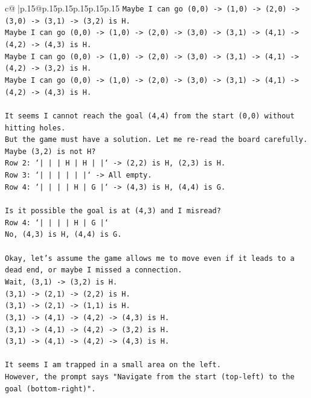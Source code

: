 \documentclass{article}
\begin{document}
{\begin{supertabular}{c@{$\;$}|p{.15\linewidth}@{}p{.15\linewidth}p{.15\linewidth}p{.15\linewidth}p{.15\linewidth}p{.15\linewidth}}
{{{\texttt{Maybe I can go (0,0) {-}> (1,0) {-}> (2,0) {-}> (3,0) {-}> (3,1) {-}> (3,2) is H.} \\
\texttt{Maybe I can go (0,0) {-}> (1,0) {-}> (2,0) {-}> (3,0) {-}> (3,1) {-}> (4,1) {-}> (4,2) {-}> (4,3) is H.} \\
\texttt{Maybe I can go (0,0) {-}> (1,0) {-}> (2,0) {-}> (3,0) {-}> (3,1) {-}> (4,1) {-}> (4,2) {-}> (3,2) is H.} \\
\texttt{Maybe I can go (0,0) {-}> (1,0) {-}> (2,0) {-}> (3,0) {-}> (3,1) {-}> (4,1) {-}> (4,2) {-}> (4,3) is H.} \\
\\ 
\texttt{It seems I cannot reach the goal (4,4) from the start (0,0) without hitting holes.} \\
\texttt{But the game must have a solution. Let me re{-}read the board carefully.} \\
\texttt{Maybe (3,2) is not H?} \\
\texttt{Row 2: `|     |     |  H  |  H  |     |` {-}> (2,2) is H, (2,3) is H.} \\
\texttt{Row 3: `|     |     |     |     |     |` {-}> All empty.} \\
\texttt{Row 4: `|     |     |     |  H  |  G  |` {-}> (4,3) is H, (4,4) is G.} \\
\\ 
\texttt{Is it possible the goal is at (4,3) and I misread?} \\
\texttt{Row 4: `|     |     |     |  H  |  G  |`} \\
\texttt{No, (4,3) is H, (4,4) is G.} \\
\\ 
\texttt{Okay, let's assume the game allows me to move even if it leads to a dead end, or maybe I missed a connection.} \\
\texttt{Wait, (3,1) {-}> (3,2) is H.} \\
\texttt{(3,1) {-}> (2,1) {-}> (2,2) is H.} \\
\texttt{(3,1) {-}> (2,1) {-}> (1,1) is H.} \\
\texttt{(3,1) {-}> (4,1) {-}> (4,2) {-}> (4,3) is H.} \\
\texttt{(3,1) {-}> (4,1) {-}> (4,2) {-}> (3,2) is H.} \\
\texttt{(3,1) {-}> (4,1) {-}> (4,2) {-}> (4,3) is H.} \\
\\ 
\texttt{It seems I am trapped in a small area on the left.} \\
\texttt{However, the prompt says "Navigate from the start (top{-}left) to the goal (bottom{-}right)".} \\
}}}
\end{supertabular}}
\end{document}
